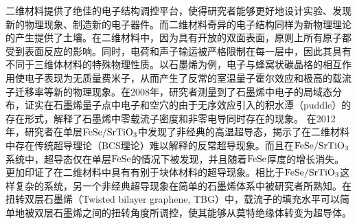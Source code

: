     二维材料提供了绝佳的电子结构调控平台，使得研究者能够更好地设计实验、发现新的物理现象、制造新的电子器件。而二维材料奇异的电子结构同样为新物理理论的产生提供了土壤。在二维材料中，因为具有开放的双面表面，原则上所有原子都受到表面反应的影响。同时，电荷和声子输运被严格限制在每一层中，因此其具有不同于三维体材料的特殊物理性质。以石墨烯为例，电子与蜂窝状碳晶格的相互作用使电子表现为无质量费米子，从而产生了反常的室温量子霍尔效应和极高的载流子迁移率等新的物理现象。在2008年，研究者测量到了石墨烯中电子的局域态分布，证实在石墨烯量子点中电子和空穴的由于无序效应引入的积水潭（puddle）的存在形式，解释了石墨烯中零载流子密度和非零电导同时存在的现象。%
    在2012年，研究者在单层$\rm{FeSe/SrTiO_{3}}$中发现了非经典的高温超导态，揭示了在二维材料中存在传统超导理论（BCS理论）难以解释的反常超导现象。而且在$\rm{FeSe/SrTiO_{3}}$系统中，超导态仅在单层$\rm{FeSe}$的情况下被发现，并且随着$\rm{FeSe}$厚度的增长消失。更加印证了在二维材料中具有有别于块体材料的超导现象。相比于$\rm{FeSe/SrTiO_{3}}$这样复杂的系统，另一个非经典超导现象在简单的石墨烯体系中被研究者所熟知。在扭转双层石墨烯（Twisted bilayer graphene, TBG）中，载流子的填充水平可以简单地被双层石墨烯之间的扭转角度所调控，使其能够从莫特绝缘体转变为超导体。

